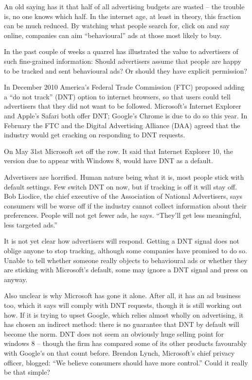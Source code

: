 An old saying has it that half of all advertising budgets are wasted – the trouble is, no one knows which half. In the internet age, at least in theory, this fraction can be much reduced. By watching what people search for, click on and say online, companies can aim ``behavioural'' ads at those most likely to buy.


In the past couple of weeks a quarrel has illustrated the value to advertisers of such fine-grained information: Should advertisers assume that people are happy to be tracked and sent behavioural ads? Or should they have explicit permission?


In December 2010 America's Federal Trade Commission (FTC) proposed adding a ``do not track'' (DNT) option to internet browsers, so that users could tell advertisers that they did not want to be followed. Microsoft's Internet Explorer and Apple's Safari both offer DNT; Google's Chrome is due to do so this year. In February the FTC and the Digital Advertising Alliance (DAA) agreed that the industry would get cracking on responding to DNT requests.


On May 31st Microsoft set off the row. It said that Internet Explorer 10, the version due to appear with Windows 8, would have DNT as a default.


Advertisers are horrified. Human nature being what it is, most people stick with default settings. Few switch DNT on now, but if tracking is off it will stay off. Bob Liodice, the chief executive of the Association of National Advertisers, says consumers will be worse off if the industry cannot collect information about their preferences. People will not get fewer ads, he says. ``They'll get less meaningful, less targeted ads.''


It is not yet clear how advertisers will respond. Getting a DNT signal does not oblige anyone to stop tracking, although some companies have promised to do so. Unable to tell whether someone really objects to behavioural ads or whether they are sticking with Microsoft's default, some may ignore a DNT signal and press on anyway.


Also unclear is why Microsoft has gone it alone. After all, it has an ad business too, which it says will comply with DNT requests, though it is still working out how. If it is trying to upset Google, which relies almost wholly on advertising, it has chosen an indirect method: there is no guarantee that DNT by default will become the norm. DNT does not seem an obviously huge selling point for windows 8 – though the firm has compared some of its other products favourably with Google's on that count before. Brendon Lynch, Microsoft's chief privacy officer, blogged: ``We believe consumers should have more control.'' Could it really be that simple?